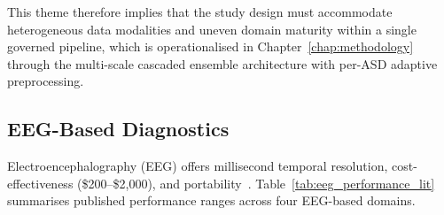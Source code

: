 \noindent This theme therefore implies that the study design must accommodate heterogeneous data modalities and uneven domain maturity within a single governed pipeline, which is operationalised in Chapter~\ref{chap:methodology} through the multi-scale cascaded ensemble architecture with per-ASD adaptive preprocessing.

\subsection{EEG-Based Diagnostics}

Electroencephalography (EEG) offers millisecond temporal resolution, cost-effectiveness (\$200--\$2,000), and portability~\cite{niedermeyer2005eeg}. Table~\ref{tab:eeg_performance_lit} summarises published performance ranges across four EEG-based domains.

%

